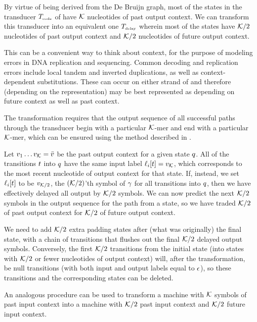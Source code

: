 \documentclass[english]{article}
\begin{document}
By virtue of being derived from the De Bruijn graph,
most of the states in the transducer $T_{\mbox{\tiny code}}$ of 
have ${\cal K}$ nucleotides of past output context.
We can transform this transducer into an equivalent one $T_{\mbox{\tiny delay}}$ wherein most of the states have
${\cal K}/2$ nucleotides of past output context
and ${\cal K}/2$ nucleotides of future output context.

This can be a convenient way to think about context, for the purpose of modeling errors in DNA replication and sequencing.
Common decoding and replication errors include local tandem and inverted duplications, as well as context-dependent substitutions.
These can occur on either strand of and therefore (depending on the representation) may be best represented as depending
on future context as well as past context.

The transformation requires that the output sequence of all successful paths through the transducer
begin with a particular ${\cal K}$-mer and end with a particular ${\cal K}$-mer,
which can be ensured using the method described in .

Let $v_{1} \ldots v_{{\cal K}} = \bar{v}$ be the past output context for a given state $q$.
All of the transitions $t$ into $q$ have the same input label $\ell_i[t] = v_{{\cal K}}$,
which corresponds to the most recent nucleotide of output context for that state.
If, instead, we set $\ell_i[t]$ to be $v_{{\cal K}/2}$, the $({\cal K}/2)$'th symbol of $\gamma$
for all transitions into $q$, then we have effectively delayed all output by ${\cal K}/2$ symbols.
We can now predict the next ${\cal K}/2$ symbols in the output sequence for the path from a state,
so we have traded ${\cal K}/2$ of past output context for ${\cal K}/2$ of future output context.

We need to add ${\cal K}/2$ extra padding states after (what was originally) the final state,
with a chain of transitions that flushes out the final ${\cal K}/2$ delayed output symbols.
Conversely, the first ${\cal K}/2$ transitions from the initial state
(into states with ${\cal K}/2$ or fewer nucleotides of output context)
will, after the transformation,
be null transitions (with both input and output labels equal to $\epsilon$),
so these transitions and the corresponding states can be deleted.

An analogous procedure can be used to transform a machine with ${\cal K}$ symbols of past input context
into a machine with ${\cal K}/2$ past input context and ${\cal K}/2$ future input context.
\end{document}
